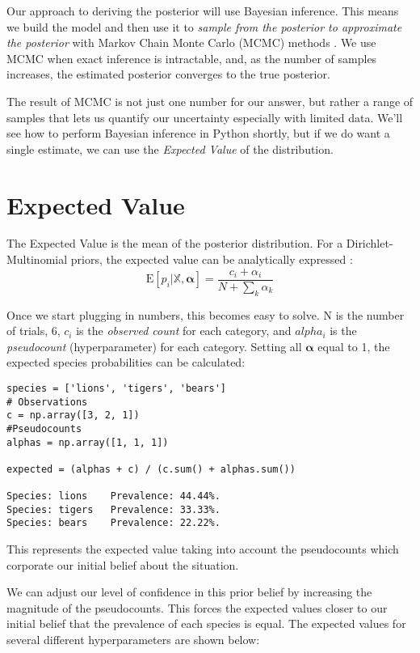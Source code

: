 Our approach to deriving the posterior will use Bayesian inference. This means we build the model and then use it to \textit{sample from the posterior to approximate the posterior} with Markov Chain Monte Carlo (MCMC) methods \cite{KoehrsenMCMCPython2018}. We use MCMC when exact inference is intractable, and, as the number of samples increases, the estimated posterior converges to the true posterior.

The result of MCMC is not just one number for our answer, but rather a range of samples that lets us quantify our uncertainty especially with limited data. We'll see how to perform Bayesian inference in Python shortly, but if we do want a single estimate, we can use the \textit{Expected Value} of the distribution.

\section{Expected Value}

The Expected Value is the mean of the posterior distribution. For a Dirichlet-Multinomial priors, the expected value  can be analytically expressed \cite{MarkJohnsonDirichletMultinomials2019}:
\begin{equation}
    \mathrm{E}\left[p_{i} | \mathbb{X}, \boldsymbol{\alpha}\right]=\frac{c_{i}+\alpha_{i}}{N+\sum_{k} \alpha_{k}}
    \end{equation}

Once we start plugging in numbers, this becomes easy to solve. N is the number of trials, 6, $c_i$ is the \textit{observed count} for each category, and $alpha_i$ is the \textit{pseudocount} (hyperparameter) for each category. Setting all $\boldsymbol{\alpha}$ equal to 1, the expected species probabilities can be calculated:

\begin{lstlisting}
species = ['lions', 'tigers', 'bears']
# Observations
c = np.array([3, 2, 1])
#Pseudocounts
alphas = np.array([1, 1, 1])

expected = (alphas + c) / (c.sum() + alphas.sum())

Species: lions    Prevalence: 44.44%.
Species: tigers   Prevalence: 33.33%.
Species: bears    Prevalence: 22.22%.
\end{lstlisting}
This represents the expected value taking into account the pseudocounts which corporate our initial belief about the situation.

We can adjust our level of confidence in this prior belief by increasing the magnitude of the pseudocounts. This forces the expected values closer to our initial belief that the prevalence of each species is equal. The expected values for several different hyperparameters are shown below:


